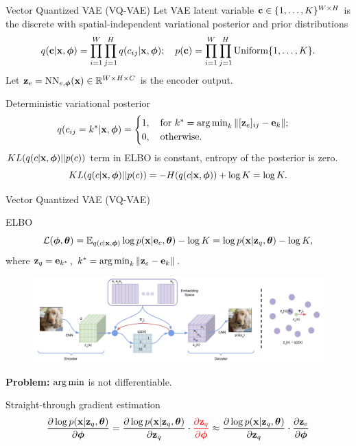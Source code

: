 \begin{frame}{Vector Quantized VAE (VQ-VAE)}
	Let VAE latent variable $\mathbf{c} \in \{1, \dots, K\}^{W \times H}$ is the discrete with spatial-independent variational posterior and prior distributions  
	\vspace{-0.3cm}
	\[
	q(\mathbf{c} | \mathbf{x}, \boldsymbol{\phi}) = \prod_{i=1}^W \prod_{j=1}^H q(c_{ij} | \mathbf{x}, \boldsymbol{\phi}); \quad p(\mathbf{c}) = \prod_{i=1}^W \prod_{j=1}^H \text{Uniform}\{1, \dots, K\}.
	\]
	Let $\mathbf{z}_e = \text{NN}_{e, \boldsymbol{\phi}}(\mathbf{x}) \in \mathbb{R}^{W \times H \times C}$ is the encoder output.
	\begin{block}{Deterministic variational posterior}
		\vspace{-0.6cm}
		\[
		q(c_{ij} = k^* | \mathbf{x}, \boldsymbol{\phi}) = \begin{cases}
			1 , \quad \text{for } k^* = \operatorname*{arg\,min}_k \| [\mathbf{z}_e]_{ij} - \mathbf{e}_k \|; \\
			0, \quad \text{otherwise}.
		\end{cases}
		\]
		$KL(q(c| \mathbf{x}, \boldsymbol{\phi}) || p(c))$ term in ELBO is constant, entropy of the posterior is zero.
		\[
		KL(q(c | \mathbf{x}, \boldsymbol{\phi}) || p(c)) = - H(q(c | \mathbf{x}, \boldsymbol{\phi})) + \log K = \log K. 
		\]
	\end{block}
	
\end{frame}
\begin{frame}{Vector Quantized VAE (VQ-VAE)}
	\begin{block}{ELBO}
		\vspace{-0.6cm}
		\[
		\mathcal{L} (\boldsymbol{\phi}, \boldsymbol{\theta})  = \mathbb{E}_{q(c | \mathbf{x}, \boldsymbol{\phi})} \log p(\mathbf{x} | \mathbf{e}_{c} , \boldsymbol{\theta}) - \log K =  \log p(\mathbf{x} | \mathbf{z}_q, \boldsymbol{\theta}) - \log K,
		\]
		where $\mathbf{z}_q = \mathbf{e}_{k^*}$, $k^* = \operatorname*{arg\,min}_k \| \mathbf{z}_e - \mathbf{e}_k \|$.
	\end{block}
	\begin{figure}
		\centering
		\includegraphics[width=0.85\linewidth]{figs/vqvae}
	\end{figure}
	\textbf{Problem:} $\operatorname*{arg\,min}$ is not differentiable.
	\begin{block}{Straight-through gradient estimation}
		\vspace{-0.6cm}
		\[
		\frac{\partial \log p(\mathbf{x} | \mathbf{z}_q , \boldsymbol{\theta})}{\partial \boldsymbol{\phi}} = \frac{\partial \log p(\mathbf{x} | \mathbf{z}_q, \boldsymbol{\theta})}{\partial \mathbf{z}_q} \cdot {\color{red}\frac{\partial \mathbf{z}_q}{\partial \boldsymbol{\phi}}} \approx \frac{\partial \log p(\mathbf{x} | \mathbf{z}_q, \boldsymbol{\theta})}{\partial \mathbf{z}_q} \cdot \frac{\partial \mathbf{z}_e}{\partial \boldsymbol{\phi}}
		\]
	\end{block}
\end{frame}
